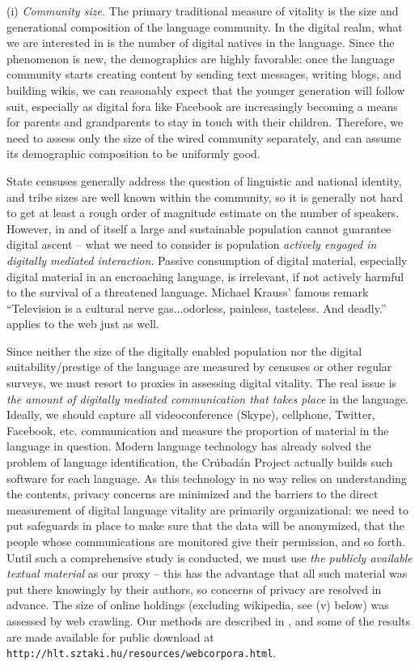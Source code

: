 \documentclass[10pt]{article}
\begin{document}
\bigskip
(i) {\it Community size.} The primary traditional measure of vitality is the
size and generational composition of the language community. In the digital
realm, what we are interested in is the number of digital natives in the
language. Since the phenomenon is new, the demographics are highly favorable:
once the language community starts creating content by sending text messages,
writing blogs, and building wikis, we can reasonably expect that the younger
generation will follow suit, especially as digital fora like Facebook are
increasingly becoming a means for parents and grandparents to stay in touch
with their children. Therefore, we need to assess only the size of the wired
community separately, and can assume its demographic composition to be
uniformly good.

State censuses generally address the question of linguistic and national
identity, and tribe sizes are well known within the community, so it is
generally not hard to get at least a rough order of magnitude estimate on the
number of speakers. However, in and of itself a large and sustainable
population cannot guarantee digital ascent -- what we need to
consider is population {\it actively engaged in digitally mediated
  interaction}. Passive consumption of digital material, especially digital
material in an encroaching language, is irrelevant, if not actively harmful to
the survival of a threatened language. Michael Krauss' famous remark
``Television is a cultural nerve gas...odorless, painless, tasteless. And
deadly.'' \cite{Cazden:2003} applies to the web just as well.

Since neither the size of the digitally enabled population nor the digital
suitability/prestige of the language are measured by censuses or other regular
surveys, we must resort to proxies in assessing digital vitality. The real
issue is {\it the amount of digitally mediated communication that takes place}
in the language. Ideally, we should capture all videoconference (Skype),
cellphone, Twitter, Facebook, etc. communication and measure the proportion of
material in the language in question.  Modern language technology has already
solved the problem of language identification, the Cr\'ubad\'an Project \cite{Scannell:2007}
actually builds such software for each language. As this technology in no way
relies on understanding the contents, privacy concerns are minimized and the
barriers to the direct measurement of digital language vitality are primarily
organizational: we need to put safeguards in place to make sure that the data
will be anonymized, that the people whose communications are monitored give
their permission, and so forth. Until such a comprehensive study is conducted,
we must use {\it the publicly available textual material} as our proxy -- this
has the advantage that all such material was put there knowingly by their
authors, so concerns of privacy are resolved in advance. The size of online
holdings (excluding wikipedia, see (v) below) was assessed by web
crawling. Our methods are described in \cite{Zseder:2012}, and some of the
results are made available for public download at {\tt
  http://hlt.sztaki.hu/resources/webcorpora.html}.
\end{document}
